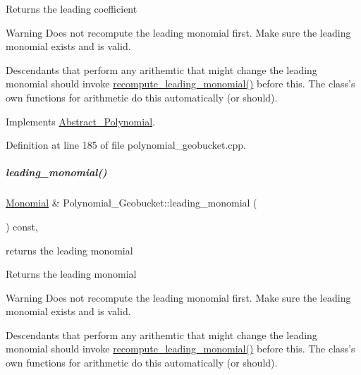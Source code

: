 \begin{DoxyReturn}{Returns}
the leading coefficient 
\end{DoxyReturn}
\begin{DoxyWarning}{Warning}
Does not recompute the leading monomial first. Make sure the leading monomial exists and is valid. 

Descendants that perform any arithemtic that might change the leading monomial should invoke \hyperlink{group__polygroup_ab57dbe8d5f0d3860997775d9f354ab0c}{recompute\+\_\+leading\+\_\+monomial()} before this. The class's own functions for arithmetic do this automatically (or should). 
\end{DoxyWarning}


Implements \hyperlink{group__polygroup_a511ce8e997fe3fd1141293d256e25fad}{Abstract\+\_\+\+Polynomial}.



Definition at line 185 of file polynomial\+\_\+geobucket.\+cpp.

\mbox{\label{group__polygroup_aeb9d72c577af4de04e1e4cce04a9f41f}} 
\subparagraph{\texorpdfstring{leading\+\_\+monomial()}{leading\_monomial()}}
{\footnotesize\ttfamily \hyperlink{group__polygroup_class_monomial}{Monomial} \& Polynomial\+\_\+\+Geobucket\+::leading\+\_\+monomial (\begin{DoxyParamCaption}{ }\end{DoxyParamCaption}) const\hspace{0.3cm}{\ttfamily [override]}, {\ttfamily [virtual]}}



returns the leading monomial 

\begin{DoxyReturn}{Returns}
the leading monomial 
\end{DoxyReturn}
\begin{DoxyWarning}{Warning}
Does not recompute the leading monomial first. Make sure the leading monomial exists and is valid. 

Descendants that perform any arithemtic that might change the leading monomial should invoke \hyperlink{group__polygroup_ab57dbe8d5f0d3860997775d9f354ab0c}{recompute\+\_\+leading\+\_\+monomial()} before this. The class's own functions for arithmetic do this automatically (or should). 
\end{DoxyWarning}


